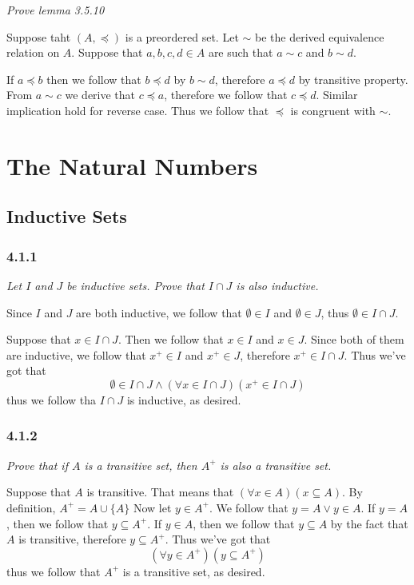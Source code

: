 \documentclass[11pt,oneside,titlepage]{book}
\begin{document}
\textit{Prove lemma 3.5.10}

Suppose taht $(A, \preceq)$ is a preordered set. Let $\sim$ be the derived equivalence
relation on $A$. Suppose that $a, b, c, d \in A$ are such that $a \sim c$ and $b \sim d$.

If $a \preceq b$ then we follow that $b \preceq d$ by $b \sim d$, therefore $a \preceq d$
by transitive property. From $a \sim c$ we derive that $c \preceq a$, therefore we
follow that $c \preceq d$. Similar implication hold for reverse case. Thus we follow that
$\preceq$ is congruent with $\sim$.


\chapter{The Natural Numbers}

\section{Inductive Sets}

\subsection*{4.1.1}

\textit{Let $I$ and $J$ be inductive sets. Prove that $I \cap J$ is also inductive.}

Since $I$ and $J$ are both inductive, we follow that $\emptyset \in I$ and $\emptyset \in J$,
thus $\emptyset \in I \cap J$.

Suppose that $x \in I \cap J$. Then we follow that $x \in I$ and $x \in J$. Since both of them
are inductive, we follow that $x^+ \in I$ and $x^+ \in J$, therefore $x^+ \in I \cap J$. Thus
we've got that
$$\emptyset \in I \cap J \land (\forall x \in I \cap J)(x^+ \in I \cap J)$$
thus we follow tha $I \cap J$ is inductive, as desired.

\subsection*{4.1.2}

\textit{Prove that if $A$ is a transitive set, then $A^+$ is also a transitive set.}

Suppose that $A$ is transitive. That means that $(\forall x \in A)(x \subseteq A)$.
By definition, $A^+ = A \cup \{A\}$
Now let $y \in A^+$. We follow that $y = A \lor y \in A$. If $y = A$, then we follow that
$y \subseteq A^+$. If $y \in A$, then we follow that $y \subseteq A$ by the fact that
$A$ is transitive, therefore $y \subseteq A^+$. Thus we've got that
$$(\forall y \in A^+)(y \subseteq A^+)$$
thus we follow that $A^+$ is a transitive set, as desired.
\end{document}
